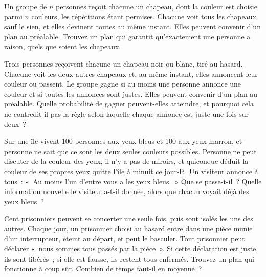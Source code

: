 \begin{question}\label{iq:iv1:logic-riddles:30}
Un groupe de $n$ personnes reçoit chacune un chapeau, dont la couleur est choisie parmi $n$ couleurs, les répétitions étant permises. Chacune voit tous les chapeaux sauf le sien, et elles devinent toutes au même instant. Elles peuvent convenir d'un plan au préalable. Trouvez un plan qui garantit qu'exactement une personne a raison, quels que soient les chapeaux.
\end{question}

\begin{question}\label{iq:iv1:logic-riddles:31}
Trois personnes reçoivent chacune un chapeau noir ou blanc, tiré au hasard. Chacune voit les deux autres chapeaux et, au même instant, elles annoncent leur couleur ou passent. Le groupe gagne si au moins une personne annonce une couleur et si toutes les annonces sont justes. Elles peuvent convenir d'un plan au préalable. Quelle probabilité de gagner peuvent-elles atteindre, et pourquoi cela ne contredit-il pas la règle selon laquelle chaque annonce est juste une fois sur deux~?
\end{question}

\begin{question}\label{iq:iv1:logic-riddles:32}
Sur une île vivent 100 personnes aux yeux bleus et 100 aux yeux marron, et personne ne sait que ce sont les deux seules couleurs possibles. Personne ne peut discuter de la couleur des yeux, il n'y a pas de miroirs, et quiconque déduit la couleur de ses propres yeux quitte l'île à minuit ce jour-là. Un visiteur annonce à tous~: «~Au moins l'un d'entre vous a les yeux bleus.~» Que se passe-t-il~? Quelle information nouvelle le visiteur a-t-il donnée, alors que chacun voyait déjà des yeux bleus~?
\end{question}

\begin{question}\label{iq:iv1:logic-riddles:33}
Cent prisonniers peuvent se concerter une seule fois, puis sont isolés les uns des autres. Chaque jour, un prisonnier choisi au hasard entre dans une pièce munie d'un interrupteur, éteint au départ, et peut le basculer. Tout prisonnier peut déclarer «~nous sommes tous passés par la pièce~». Si cette déclaration est juste, ils sont libérés~; si elle est fausse, ils restent tous enfermés. Trouvez un plan qui fonctionne à coup sûr. Combien de temps faut-il en moyenne~?
\end{question}

